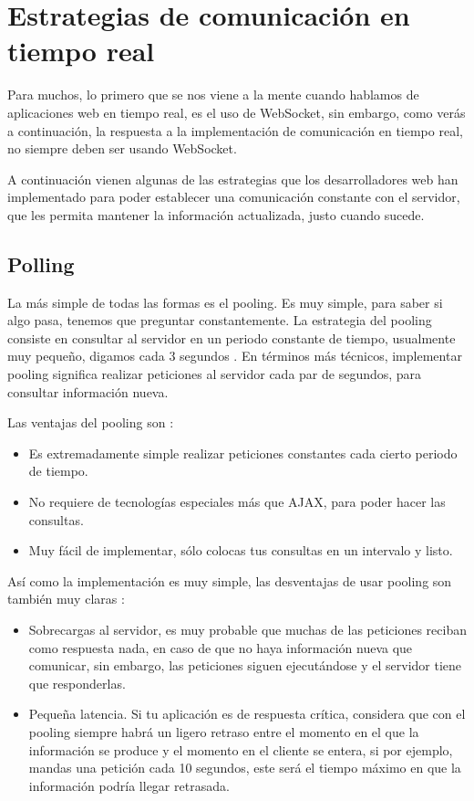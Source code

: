 \section{Estrategias de comunicación en tiempo real}

Para muchos, lo primero que se nos viene a la mente cuando hablamos de aplicaciones web en tiempo real, es el uso de WebSocket, sin embargo, como verás a continuación, la respuesta a la implementación de comunicación en tiempo real, no siempre deben ser usando WebSocket.

A continuación vienen algunas de las estrategias que los desarrolladores web han implementado para poder establecer una comunicación constante con el servidor, que les permita mantener la información actualizada, justo cuando sucede.

\subsection{Polling}

La más simple de todas las formas es el pooling. Es muy simple, para saber si algo pasa, tenemos que preguntar constantemente. La estrategia del pooling consiste en consultar al servidor en un periodo constante de tiempo, usualmente muy pequeño, digamos cada 3 segundos \cite{app10}. En términos más técnicos, implementar pooling significa realizar peticiones al servidor cada par de segundos, para consultar información nueva.

Las ventajas del pooling son \cite{app10}:

\begin{itemize}
  \item Es extremadamente simple realizar peticiones constantes cada cierto periodo de tiempo.
  \item No requiere de tecnologías especiales más que AJAX, para poder hacer las consultas.
  \item Muy fácil de implementar, sólo colocas tus consultas en un intervalo y listo.
\end{itemize}

Así como la implementación es muy simple, las desventajas de usar pooling son también muy claras \cite{app10}:

\begin{itemize}
  \item Sobrecargas al servidor, es muy probable que muchas de las peticiones reciban como respuesta nada, en caso de que no haya información nueva que comunicar, sin embargo, las peticiones siguen ejecutándose y el servidor tiene que responderlas.
  \item Pequeña latencia. Si tu aplicación es de respuesta crítica, considera que con el pooling siempre habrá un ligero retraso entre el momento en el que la información se produce y el momento en el cliente se entera, si por ejemplo, mandas una petición cada 10 segundos, este será el tiempo máximo en que la información podría llegar retrasada.
\end{itemize}

